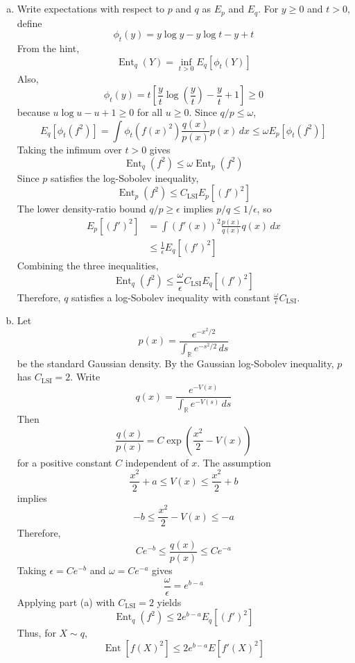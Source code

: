 \documentclass[11pt,a4paper,margin=1in]{article}
\begin{document}
\section{}
\begin{enumerate}[(a)]
    \item Write expectations with respect to $p$ and $q$ as $E_p$ and $E_q$. For 
    $y\geq0$ and $t>0$, define
    \[
        \phi_t(y)=y\log y-y\log t-y+t
    \]
    From the hint,
    \[
        \operatorname{Ent}_q(Y)=\inf_{t>0}E_q[\phi_t(Y)]
    \]
    Also,
    \[
        \phi_t(y)=t\left[\frac{y}{t}\log\left(\frac{y}{t}\right)-\frac{y}{t}+1\right]\geq0
    \]
    because $u\log u-u+1\geq0$ for all $u\geq0$. Since $q/p\leq\omega$,
    \[
        E_q[\phi_t(f^2)] =\int \phi_t(f(x)^2)\frac{q(x)}{p(x)}p(x)\,dx \leq \omega E_p[\phi_t(f^2)]
    \]
    Taking the infimum over $t>0$ gives
    \[
        \operatorname{Ent}_q(f^2)\leq\omega\operatorname{Ent}_p(f^2)
    \]
    Since $p$ satisfies the log-Sobolev inequality,
    \[
        \operatorname{Ent}_p(f^2)\leq C_{\mathrm{LSI}}E_p[(f')^2]
    \]
    The lower density-ratio bound $q/p\geq\epsilon$ implies $p/q\leq1/\epsilon$, so
    \begin{align*}
        E_p[(f')^2] &= \int (f'(x))^2\frac{p(x)}{q(x)}q(x)\,dx \\
        &\leq \frac{1}{\epsilon}E_q[(f')^2]
    \end{align*}
    Combining the three inequalities,
    \[
        \operatorname{Ent}_q(f^2) \leq \frac{\omega}{\epsilon}C_{\mathrm{LSI}}E_q[(f')^2]
    \]
    Therefore, $q$ satisfies a log-Sobolev inequality with constant $\frac{\omega}{\epsilon}C_{\mathrm{LSI}}$.

    \item Let
    \[
        p(x)=\frac{e^{-x^2/2}}{\int_{\mathbb R}e^{-s^2/2}\,ds}
    \]
    be the standard Gaussian density. By the Gaussian log-Sobolev inequality, $p$ has $C_{\mathrm{LSI}}=2$.
    Write
    \[
        q(x)=\frac{e^{-V(x)}}{\int_{\mathbb R}e^{-V(s)}\,ds}
    \]
    Then
    \[
        \frac{q(x)}{p(x)}
        = C\exp\left(\frac{x^2}{2}-V(x)\right)
    \]
    for a positive constant $C$ independent of $x$. The assumption
    \[
        \frac{x^2}{2}+a\leq V(x)\leq \frac{x^2}{2}+b
    \]
    implies
    \[
        -b\leq \frac{x^2}{2}-V(x)\leq-a
    \]
    Therefore,
    \[
        Ce^{-b}\leq\frac{q(x)}{p(x)}\leq Ce^{-a}
    \]
    Taking $\epsilon=Ce^{-b}$ and $\omega=Ce^{-a}$ gives
    \[
        \frac{\omega}{\epsilon}=e^{b-a}
    \]
    Applying part (a) with $C_{\mathrm{LSI}}=2$ yields
    \[
        \operatorname{Ent}_q(f^2) \leq 2e^{b-a}E_q[(f')^2]
    \]
    Thus, for $X\sim q$,
    \[
        \operatorname{Ent}[f(X)^2]\leq2e^{b-a}E[f'(X)^2]
    \]
\end{enumerate}
\end{document}
